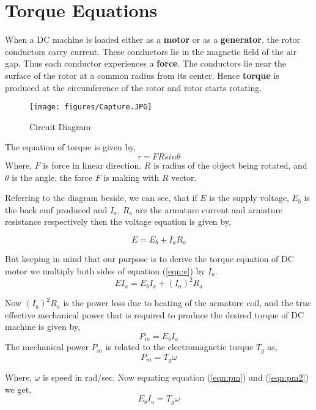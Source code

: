 \documentclass{article}
\begin{document}
\section{Torque Equations}
When a DC machine is loaded either as a \textbf{motor} or as a \textbf{generator}, the rotor conductors carry current. These conductors lie in the magnetic field of the air gap. Thus each conductor experiences a \textbf{force}. The conductors lie near the surface of the rotor at a common radius from its center. Hence \textbf{torque} is produced at the circumference of the rotor and rotor starts rotating.
\begin{figure}[b]
  \centering
   \texttt{[image: figures/Capture.JPG]}
    \caption{Circuit Diagram}
    \label{fig:my_label}
\end{figure}
The equation of torque is given by, 
\begin{equation}
    \tau = FRsin\theta
\end{equation}
Where, $F$ is force in linear direction.
$R$ is radius of the object being rotated,
and $\theta$ is the angle, the force $F$ is making with $R$ vector.

Referring to the diagram beside, we can see, that if $E$ is the supply voltage, $E_b$ is the back emf produced and $I_a$, $R_a$ are the armature current and armature resistance respectively then the voltage equation is given by,

 \begin{equation}
 \label{eqn:e}
    E = E_b+ I_a R_a
\end{equation}

But keeping in mind that our purpose is to derive the torque equation of DC motor we multiply both sides of equation (\ref{eqn:e}) by $I_a$.
\begin{equation}
    E I_a = E_bI_a+ (I_a)^2 R_a
\end{equation}
 
Now $(I_a)^2 R_a$ is the power loss due to heating of the armature coil, and the true effective mechanical power that is required to produce the desired torque of DC machine is given by,
 \begin{equation}
  \label{eqn:pm}
    P_m = E_bI_a
\end{equation}
The mechanical power $P_m$ is related to the electromagnetic torque $T_g$ as,
\begin{equation}
\label{eqn:pm2}
    P_m =T_g \omega
\end{equation}

 
Where, $\omega$ is speed in rad/sec.
Now equating equation (\ref{eqn:pm}) and (\ref{eqn:pm2})  we get,
 \begin{equation}
 \label{eqn:eb}
    E_bI_a=T_g \omega
\end{equation}
\end{document}
